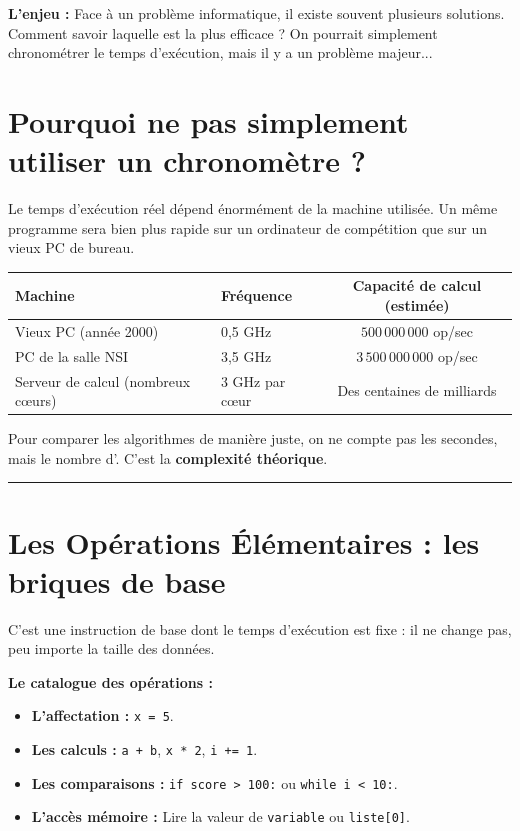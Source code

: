  \textbf{L'enjeu :} Face à un problème informatique, il existe souvent plusieurs solutions. Comment savoir laquelle est la plus efficace ? On pourrait simplement chronométrer le temps d'exécution, mais il y a un problème majeur...

\section*{Pourquoi ne pas simplement utiliser un chronomètre ? }

Le temps d'exécution réel dépend énormément de la machine utilisée. Un même programme sera bien plus rapide sur un ordinateur de compétition que sur un vieux PC de bureau.

\begin{center}
\begin{tabular}{llc}
     \hline
     \textbf{Machine} & \textbf{Fréquence} & \textbf{Capacité de calcul (estimée)} \\ \hline
     Vieux PC (année 2000) & 0,5 GHz & $500\,000\,000$ op/sec \\
     PC de la salle NSI & 3,5 GHz & $3\,500\,000\,000$ op/sec \\
     Serveur de calcul (nombreux c\oe urs) & 3 GHz par c\oe ur & Des centaines de milliards \\ \hline
\end{tabular}
\end{center}

Pour comparer les algorithmes de manière juste, on ne compte pas les secondes, mais le nombre d'. C'est la \textbf{complexité théorique}.

\vspace{0.3cm}
\hrule
\vspace{0.3cm}

\section*{Les Opérations Élémentaires : les briques de base}

\begin{Definition}
C'est une instruction de base dont le temps d'exécution est fixe : il ne change pas, peu importe la taille des données.
\end{Definition}

 \textbf{Le catalogue des opérations :}
\begin{itemize}
    \item \textbf{L'affectation :} \texttt{x = 5}.
    \item \textbf{Les calculs :} \texttt{a + b}, \texttt{x * 2}, \texttt{i += 1}.
    \item \textbf{Les comparaisons :} \texttt{if score > 100:} ou \texttt{while i < 10:}.
    \item \textbf{L'accès mémoire :} Lire la valeur de \texttt{variable} ou \texttt{liste[0]}.
\end{itemize}

